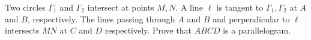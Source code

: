Two circles $\Gamma_1$ and $\Gamma_2$ intersect at points $M,N$. A line $\ell$ is tangent to $\Gamma_1 ,\Gamma_2$ at $A$ and $B$, respectively. The lines passing through $A$ and $B$ and perpendicular to $\ell$ intersects $MN$ at $C$ and $D$ respectively. Prove that $ABCD$ is a parallelogram.